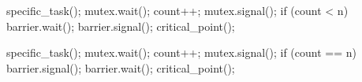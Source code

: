 \documentclass[varwidth=26em,crop]{standalone}
\begin{document}
\begin{minipage}{.46\linewidth}
\vspace{1em}
\begin{pythoncode}
specific_task();
mutex.wait();
   count++;
mutex.signal();
if (count < n)
   barrier.wait();
barrier.signal();
critical_point();      
\end{pythoncode}
\end{minipage}\qquad
\begin{minipage}{.45\linewidth}
\vspace{1em}
\begin{pythoncode}
specific_task();
mutex.wait();
   count++;
mutex.signal();
if (count == n)
   barrier.signal();
barrier.wait();
critical_point();
\end{pythoncode}
\end{minipage}
\end{document}
